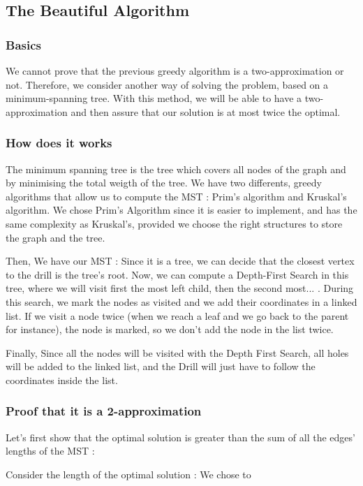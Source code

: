 \documentclass[11pt]{article}
\begin{document}
\subsection{The Beautiful Algorithm}

\subsubsection{Basics}
We cannot prove that the previous greedy algorithm is a two-approximation or not. Therefore, we consider another way of solving the problem, based on a minimum-spanning tree. With this method, we will be able to have a two-approximation and then assure that our solution is at most twice the optimal.
\subsubsection{How does it works}

The minimum spanning tree is the tree which covers all nodes of the graph and by minimising the total weigth of the tree.
We have two differents, greedy algorithms that allow us to compute the MST : Prim's algorithm and Kruskal's algorithm. We chose Prim's Algorithm since it is easier to implement, and has the same complexity as Kruskal's, provided we choose the right structures to store the graph and the tree.

Then, We have our MST : Since it is a tree, we can decide that the closest vertex to the drill is the tree's root.
Now, we can compute a Depth-First Search in this tree, where we will visit first the most left child, then the second most... .
During this search, we mark the nodes as visited and we add their coordinates in a linked list. If we visit a node twice (when we reach a leaf and we go back to the parent for instance), the node is marked, so we don't add the node in the list twice.

Finally, Since all the nodes will be visited with the Depth First Search, all holes will be added to the linked list, and the Drill will just have to follow the coordinates inside the list.

\subsubsection{Proof that it is a 2-approximation}

Let's first show that the optimal solution is greater than the sum of all the edges' lengths of the MST :

Consider the length of the optimal solution : We chose to
\end{document}
